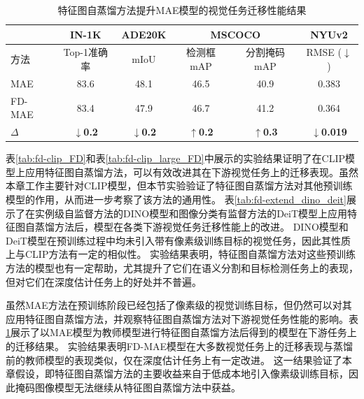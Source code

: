 \begin{table}
        \centering
    \caption{
特征图自蒸馏方法提升MAE模型的视觉任务迁移性能结果
}
        \begin{tabular}{lccccc}
            \toprule
               & IN-1K & ADE20K & \multicolumn{2}{c}{MSCOCO} & NYUv2 \\
               \midrule
              方法 &  Top-1准确率   &  mIoU  & 检测框mAP & 分割掩码mAP & RMSE\scriptsize{ ($\downarrow$)}\\
              \midrule
              MAE & 83.6 & 48.1 & 46.5 & 40.9 & 0.383 \\
              FD-MAE & 83.4 & 47.9 & 46.7 & 41.2 & 0.364 \\
              $\Delta$ & \textbf{$\downarrow$0.2} & \textbf{$\downarrow$0.2} & \textbf{$\uparrow$0.2} & \textbf{$\uparrow$0.3} & \textbf{$\downarrow$0.019} \\
            \bottomrule
        \end{tabular}
        \label{tab:fd-extend_mae}
\end{table}

表\ref{tab:fd-clip_FD}和表\ref{tab:fd-clip_large_FD}中展示的实验结果证明了在CLIP模型上应用特征图自蒸馏方法，可以有效改进其在下游视觉任务上的迁移表现。虽然本章工作主要针对CLIP模型，但本节实验验证了特征图自蒸馏方法对其他预训练模型的作用，从而进一步考察了该方法的通用性。
表\ref{tab:fd-extend_dino_deit}展示了在实例级自监督方法的DINO模型\cite{dino}和图像分类有监督方法的DeiT模型\cite{deit}上应用特征图自蒸馏方法后，模型在各类下游视觉任务迁移性能上的改进。
DINO模型和DeiT模型在预训练过程中均未引入带有像素级训练目标的视觉任务，因此其性质上与CLIP方法有一定的相似性。
实验结果表明，特征图自蒸馏方法对这些预训练方法的模型也有一定帮助，尤其提升了它们在语义分割和目标检测任务上的表现，但对它们在深度估计任务上的好处并不普遍。

虽然MAE方法在预训练阶段已经包括了像素级的视觉训练目标，但仍然可以对其应用特征图自蒸馏方法，并观察特征图自蒸馏方法对下游视觉任务性能的影响。表\ref{tab:fd-extend_mae}展示了以MAE模型为教师模型进行特征图自蒸馏方法后得到的模型在下游任务上的迁移结果。
实验结果表明FD-MAE模型在大多数视觉任务上的迁移表现与蒸馏前的教师模型的表现类似，仅在深度估计任务上有一定改进。%
这一结果验证了本章假设，即特征图自蒸馏方法的主要收益来自于低成本地引入像素级训练目标，因此掩码图像模型无法继续从特征图自蒸馏方法中获益。

